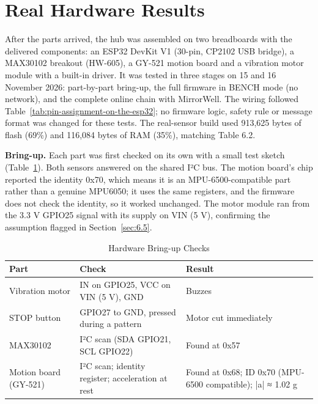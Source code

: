 \documentclass[12pt,letterpaper,oneside]{report}
\begin{document}
\section{Real Hardware Results}\label{sec:6.hw}

After the parts arrived, the hub was assembled on two breadboards with the delivered components: an ESP32 DevKit V1 (30-pin, CP2102 USB bridge), a MAX30102 breakout (HW-605), a GY-521 motion board and a vibration motor module with a built-in driver. It was tested in three stages on 15 and 16 November 2026: part-by-part bring-up, the full firmware in BENCH mode (no network), and the complete online chain with MirrorWell. The wiring followed Table~\ref{tab:pin-assignment-on-the-esp32}; no firmware logic, safety rule or message format was changed for these tests. The real-sensor build used 913,625 bytes of flash (69\%) and 116,084 bytes of RAM (35\%), matching Table 6.2.

\textbf{Bring-up.} Each part was first checked on its own with a small test sketch (Table~\ref{tab:hardware-bring-up-checks}). Both sensors answered on the shared I²C bus. The motion board's chip reported the identity 0x70, which means it is an MPU-6500-compatible part rather than a genuine MPU6050; it uses the same registers, and the firmware does not check the identity, so it worked unchanged. The motor module ran from the 3.3 V GPIO25 signal with its supply on VIN (5 V), confirming the assumption flagged in Section~\ref{sec:6.5}.

\begin{table}[H]
\centering\small{}
\caption{Hardware Bring-up Checks}\label{tab:hardware-bring-up-checks}
\begin{tabular}{|>{\raggedright\arraybackslash}p{}|>{\raggedright\arraybackslash}p{}|>{\raggedright\arraybackslash}p{}|}
\hline
\rowcolor{headgray}\textbf{Part} & \textbf{Check} & \textbf{Result} \\ \hline
Vibration motor & IN on GPIO25, VCC on VIN (5 V), GND & Buzzes \\ \hline
STOP button & GPIO27 to GND, pressed during a pattern & Motor cut immediately \\ \hline
MAX30102 & I²C scan (SDA GPIO21, SCL GPIO22) & Found at 0x57 \\ \hline
Motion board (GY-521) & I²C scan; identity register; acceleration at rest & Found at 0x68; ID 0x70 (MPU-6500 compatible); |a| ≈ 1.02 g \\ \hline
\end{tabular}
\end{table}
\end{document}
